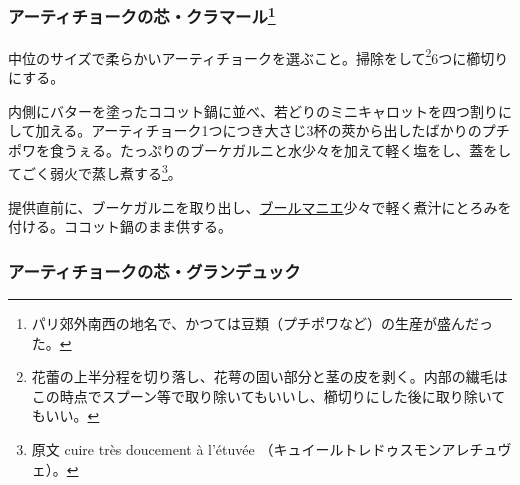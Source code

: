 \begin{recette}
\atoaki{}

\hypertarget{coeurs-d-artichauts-clamart}{%
\subsubsection[アーティチョークの芯・クラマール]{\texorpdfstring{アーティチョークの芯・クラマール\footnote{パリ郊外南西の地名で、かつては豆類（プチポワなど）の生産が盛んだった。}}{アーティチョークの芯・クラマール}}\label{coeurs-d-artichauts-clamart}}



中位のサイズで柔らかいアーティチョークを選ぶこと。掃除をして\footnote{花蕾の上半分程を切り落し、花萼の固い部分と茎の皮を剥く。内部の繊毛はこの時点でスプーン等で取り除いてもいいし、櫛切りにした後に取り除いてもいい。}6つに櫛切りにする。

内側にバターを塗ったココット鍋に並べ、若どりのミニキャロットを四つ割りにして加える。アーティチョーク1つにつき大さじ3杯の莢から出したばかりのプチポワを食うぇる。たっぷりのブーケガルニと水少々を加えて軽く塩をし、蓋をしてごく弱火で蒸し煮する\footnote{原文
  cuire très doucement à l'étuvée
  （キュイールトレドゥスモンアレチュヴェ）。}。

提供直前に、ブーケガルニを取り出し、\protect\hyperlink{beurre-manie}{ブールマニエ}少々で軽く煮汁にとろみを付ける。ココット鍋のまま供する。

\atoaki{}

\hypertarget{coeurs-d-artichauts-grand-duc}{%
\subsubsection{アーティチョークの芯・グランデュック}\label{coeurs-d-artichauts-grand-duc}}




\end{recette}
